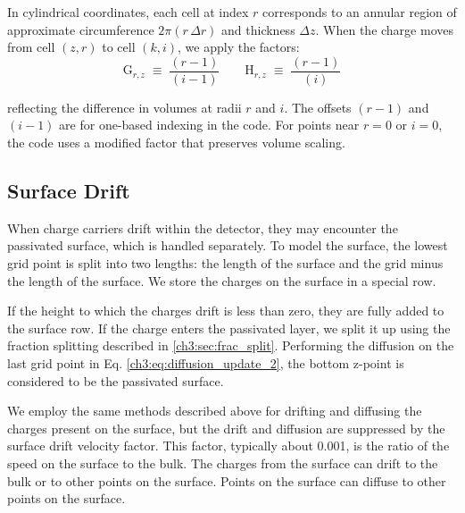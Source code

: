 In cylindrical coordinates, each cell at index $r$ corresponds to an annular region of approximate circumference $2\pi (r \,\Delta r)$ and thickness $\Delta z$. When the charge moves from cell $(z,r)$ to cell $(k,i)$, we apply the factors:
\[
\text{G}_{r,z} \;\equiv\; \frac{(r-1)}{(i-1)}
\qquad
\text{H}_{r,z} \;\equiv\; \frac{(r-1)}{(i)}
\] 

reflecting the difference in volumes at radii $r$ and $i$.
The offsets $(r-1)$ and $(i-1)$ are for one-based indexing in the code. For points near $r=0$ or $i=0$, the code uses a modified factor that preserves volume scaling. 


\subsection{Surface Drift}

When charge carriers drift within the detector, they may encounter the passivated surface, which is handled separately. To model the surface, the lowest grid point is split into two lengths: the length of the surface and the grid minus the length of the surface. We store the charges on the surface in a special row. 

If the height to which the charges drift is less than zero, they are fully added to the surface row. If the charge enters the passivated layer, we split it up using the fraction splitting described in \ref{ch3:sec:frac_split}. Performing the diffusion on the last grid point in Eq. \ref{ch3:eq:diffusion_update_2}, the bottom z-point is considered to be the passivated surface. 


We employ the same methods described above for drifting and diffusing the charges present on the surface, but the drift and diffusion are suppressed by the surface drift velocity factor. This factor, typically about 0.001, is the ratio of the speed on the surface to the bulk. The charges from the surface can drift to the bulk or to other points on the surface. Points on the surface can diffuse to other points on the surface.

